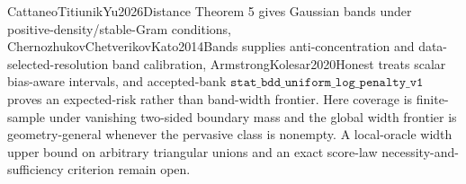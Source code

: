 CattaneoTitiunikYu2026Distance Theorem 5 gives Gaussian bands under positive-density/stable-Gram conditions, ChernozhukovChetverikovKato2014Bands supplies anti-concentration and data-selected-resolution band calibration, ArmstrongKolesar2020Honest treats scalar bias-aware intervals, and accepted-bank \(\texttt{stat\_bdd\_uniform\_log\_penalty\_v1}\) proves an expected-risk rather than band-width frontier. Here coverage is finite-sample under vanishing two-sided boundary mass and the global width frontier is geometry-general whenever the pervasive class is nonempty. A local-oracle width upper bound on arbitrary triangular unions and an exact score-law necessity-and-sufficiency criterion remain open.